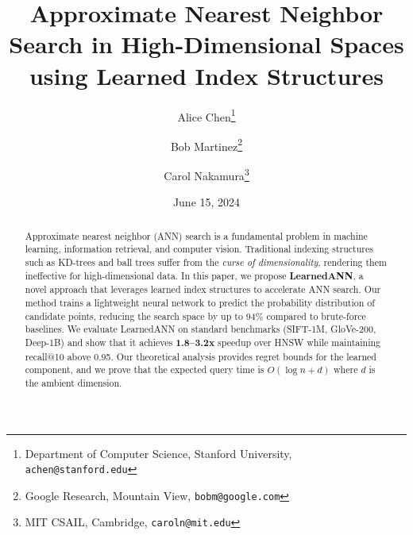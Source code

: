 \documentclass[10pt,twocolumn]{article}
\title{Approximate Nearest Neighbor Search in High-Dimensional Spaces using Learned Index Structures}
\author{
  Alice Chen\thanks{Department of Computer Science, Stanford University, \texttt{achen@stanford.edu}} \and
  Bob Martinez\thanks{Google Research, Mountain View, \texttt{bobm@google.com}} \and
  Carol Nakamura\thanks{MIT CSAIL, Cambridge, \texttt{caroln@mit.edu}}
}
\date{June 15, 2024}
\begin{document}
\maketitle

\begin{abstract}
Approximate nearest neighbor (ANN) search is a fundamental problem in machine learning, information retrieval, and computer vision. Traditional indexing structures such as KD-trees and ball trees suffer from the \emph{curse of dimensionality}, rendering them ineffective for high-dimensional data. In this paper, we propose \textbf{LearnedANN}, a novel approach that leverages learned index structures to accelerate ANN search. Our method trains a lightweight neural network to predict the probability distribution of candidate points, reducing the search space by up to 94\% compared to brute-force baselines. We evaluate LearnedANN on standard benchmarks (SIFT-1M, GloVe-200, Deep-1B) and show that it achieves \textbf{1.8--3.2x} speedup over HNSW while maintaining recall@10 above 0.95. Our theoretical analysis provides regret bounds for the learned component, and we prove that the expected query time is $O(\log n + d)$ where $d$ is the ambient dimension.
\end{abstract}





\end{document}
